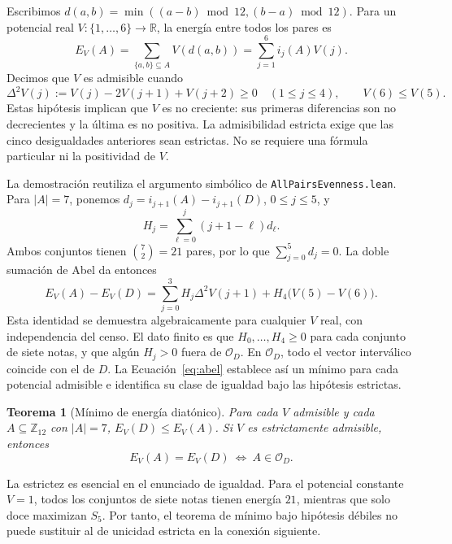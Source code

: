 \documentclass[11pt]{article}
\newtheorem{theorem}{Teorema}
\newcommand{\lean}[1]{\texttt{#1}}
\newcommand{\Ztwelve}{\mathbb{Z}_{12}}
\newcommand{\orb}{\mathcal O_D}
\begin{document}
Escribimos $d(a,b)=\min((a-b)\bmod12,(b-a)\bmod12)$. Para un potencial real
$V:\{1,\ldots,6\}\to\mathbb R$, la energía entre todos los pares es
\begin{equation}\label{eq:energy}
 E_V(A)=\sum_{\{a,b\}\subseteq A}V(d(a,b))
       =\sum_{j=1}^{6}i_j(A)V(j).
\end{equation}
Decimos que $V$ es admisible cuando
\begin{equation}\label{eq:admissible}
 \Delta^2V(j):=V(j)-2V(j+1)+V(j+2)\ge0\quad(1\le j\le4),
 \qquad V(6)\le V(5).
\end{equation}
Estas hipótesis implican que $V$ es no creciente: sus primeras diferencias son no
decrecientes y la última es no positiva. La admisibilidad estricta exige que las cinco
desigualdades anteriores sean estrictas. No se requiere una fórmula particular ni la
positividad de $V$.

La demostración reutiliza el argumento simbólico de \lean{AllPairsEvenness.lean}.
Para $|A|=7$, ponemos $d_j=i_{j+1}(A)-i_{j+1}(D)$, $0\le j\le5$, y
\[
 H_j=\sum_{\ell=0}^{j}(j+1-\ell)d_\ell.
\]
Ambos conjuntos tienen $\binom72=21$ pares, por lo que $\sum_{j=0}^5d_j=0$.
La doble sumación de Abel da entonces
\begin{equation}\label{eq:abel}
 E_V(A)-E_V(D)=\sum_{j=0}^{3}H_j\Delta^2V(j+1)
                      +H_4\bigl(V(5)-V(6)\bigr).
\end{equation}
Esta identidad se demuestra algebraicamente para cualquier $V$ real, con independencia
del censo. El dato finito es que $H_0,\ldots,H_4\ge0$ para cada conjunto de siete notas,
y que algún $H_j>0$ fuera de $\orb$. En $\orb$, todo el vector interválico coincide con
el de $D$. La Ecuación~\eqref{eq:abel} establece así un mínimo para cada potencial
admisible e identifica su clase de igualdad bajo las hipótesis estrictas.

\begin{theorem}[Mínimo de energía diatónico]\label{thm:energy}
Para cada $V$ admisible y cada $A\subseteq\Ztwelve$ con $|A|=7$,
$E_V(D)\le E_V(A)$. Si $V$ es estrictamente admisible, entonces
\[
 E_V(A)=E_V(D)\ \Longleftrightarrow\ A\in\orb.
\]
\end{theorem}

La estrictez es esencial en el enunciado de igualdad. Para el potencial constante $V=1$,
todos los conjuntos de siete notas tienen energía $21$, mientras que solo doce maximizan
$S_5$. Por tanto, el teorema de mínimo bajo hipótesis débiles no puede sustituir al de
unicidad estricta en la conexión siguiente.
\end{document}

